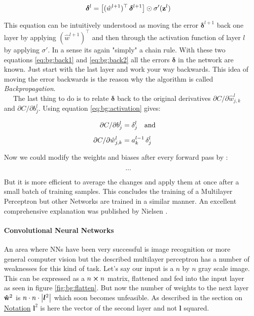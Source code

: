 \begin{equation} \label{eq:bg:back2}
    \boldsymbol \delta^l =
    \qty[(\hat w^{l+1})^\top \, \boldsymbol \delta^{l+1}]
    \odot \sigma'(\vb z^l)
\end{equation}

This equation can be intuitively understood as moving the error
$\boldsymbol \delta^{l+1}$ back one layer by applying $(\hat w^{l+1})^\top$ and then through the activation function of layer $l$ by applying $\sigma'$. In a sense its again "simply" a chain rule. With these two equations \eqref{eq:bg:back1} and \eqref{eq:bg:back2} all the errors $\boldsymbol \delta$ in the network are known. Just start with the last layer and work your way backwards. This idea of moving the error backwards is the reason why the algorithm is called \textit{Backpropagation}. \\

$\quad$ The last thing to do is to relate $\boldsymbol \delta$ back to the original derivatives $\partial C / \partial \hat w^l_{j,k}$ and $\partial C / \partial b^l_j$. Using equation \eqref{eq:bg:activation} gives:

\begin{align}
    \partial C / \partial b^l_j &= \delta^l_j \qq{and} \\[5pt]
    \partial C / \partial \hat w^l_{j,k} &= a^{l-1}_k \, \delta^l_j
\end{align}

Now we could modify the weights and biases after every forward pass by :

\begin{equation}
    \dots
\end{equation}

But it is more efficient to average the changes and apply them at once after a small batch of training samples. This concludes the training of a Multilayer Perceptron but other Networks are trained in a similar manner. An excellent comprehensive explanation was published by Nielsen \cite{backprop}.

\paragraph{Convolutional Neural Networks}
An area where NNs have been very successful is image recognition or more general computer vision but the described multilayer perceptron has a number of weaknesses for this kind of task. Let's say our input is a $n$ by $n$ gray scale image. This can be expressed as a $n \cp n$ matrix, flattened and fed into the input layer as seen in figure \ref{fig:bg:flatten}. But now the number of weights to the next layer $\vu{w}^2$ is $n \cdot n \cdot \qty| \boldsymbol l^2|$
which soon becomes unfeasible. As described in the section on \hyperref[sec:notation]{Notation} $\boldsymbol l^2$ is here the vector of the second layer and not $\boldsymbol l$ squared.

